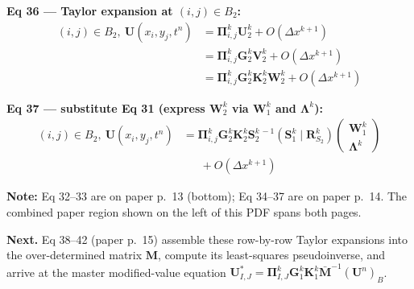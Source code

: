 \medskip

\textbf{Eq 36 --- Taylor expansion at $(i, j) \in B_2$:}
\begin{equation*}
\begin{aligned}
  (i,j) \in B_2,\ \boldsymbol{U}(x_i, y_j, t^n)
  &= \boldsymbol{\Pi}_{i,j}^k \boldsymbol{U}_2^k + O(\Delta x^{k+1}) \\
  &= \boldsymbol{\Pi}_{i,j}^k \boldsymbol{G}_2^k \boldsymbol{V}_2^k + O(\Delta x^{k+1}) \\
  &= \boldsymbol{\Pi}_{i,j}^k \boldsymbol{G}_2^k \boldsymbol{K}_2^k \boldsymbol{W}_2^k + O(\Delta x^{k+1})
\end{aligned}
\tag{36}
\end{equation*}

\textbf{Eq 37 --- substitute Eq 31 (express $\boldsymbol{W}_2^k$
via $\boldsymbol{W}_1^k$ and $\boldsymbol{\Lambda}^k$):}
\begin{equation*}
\begin{aligned}
  (i,j) \in B_2,\ \boldsymbol{U}(x_i, y_j, t^n)
  &= \boldsymbol{\Pi}_{i,j}^k \boldsymbol{G}_2^k \boldsymbol{K}_2^k
    \boldsymbol{S}_2^{k\,-1}
    (\boldsymbol{S}_1^k \mid \boldsymbol{R}_{S_2}^k)
    \begin{pmatrix} \boldsymbol{W}_1^k \\ \boldsymbol{\Lambda}^k \end{pmatrix} \\
  &\phantom{=}\ + O(\Delta x^{k+1})
\end{aligned}
\tag{37}
\end{equation*}

\medskip

\textbf{Note:} Eq 32--33 are on paper p.\ 13 (bottom);
Eq 34--37 are on paper p.\ 14. The combined paper region shown on
the left of this PDF spans both pages.

\textbf{Next.} Eq 38--42 (paper p.\ 15) assemble these row-by-row
Taylor expansions into the over-determined matrix $\boldsymbol{M}$,
compute its least-squares pseudoinverse, and arrive at the master
modified-value equation
$\boldsymbol{U}^*_{I,J} = \boldsymbol{\Pi}_{I,J}^k \boldsymbol{G}_1^k
\boldsymbol{K}_1^k \bar{\boldsymbol{M}}^{-1} (\boldsymbol{U}^n)_B$.
